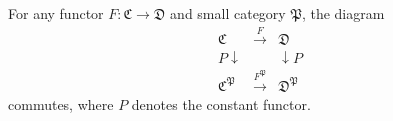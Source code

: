 For any functor $F : \mathfrak{C} \to \mathfrak{D}$ and small category $\mathfrak{P}$, the diagram
$$
\begin{array}{ccc}
\mathfrak{C} & \xrightarrow{F} & \mathfrak{D} \\
{\scriptstyle P}\downarrow & & \downarrow{\scriptstyle P} \\
\mathfrak{C}^{\mathfrak{P}} & \xrightarrow{F^{\mathfrak{P}}} & \mathfrak{D}^{\mathfrak{P}}
\end{array}
$$
commutes, where $P$ denotes the constant functor.
